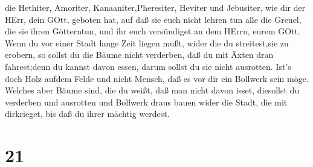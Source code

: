 die Hethiter, Amoriter, Kanaaniter,Pheresiter, Heviter und Jebusiter,
wie dir der HErr, dein GOtt, geboten hat,  auf daß sie euch
nicht lehren tun alle die Greuel, die sie ihren Götterntun, und ihr euch
versündiget an dem HErrn, eurem GOtt.  Wenn du vor einer
Stadt lange Zeit liegen mußt, wider die du streitest,sie zu erobern, so
sollst du die Bäume nicht verderben, daß du mit Äxten dran fahrest;denn
du kannst davon essen, darum sollst du sie nicht ausrotten. Ist's doch
Holz aufdem Felde und nicht Mensch, daß es vor dir ein Bollwerk sein
möge.  Welches aber Bäume sind, die du weißt, daß man nicht
davon isset, diesollst du verderben und ausrotten und Bollwerk draus
bauen wider die Stadt, die mit dirkrieget, bis daß du ihrer mächtig
werdest.

\hypertarget{section-20}{%
\section{21}\label{section-20}}

